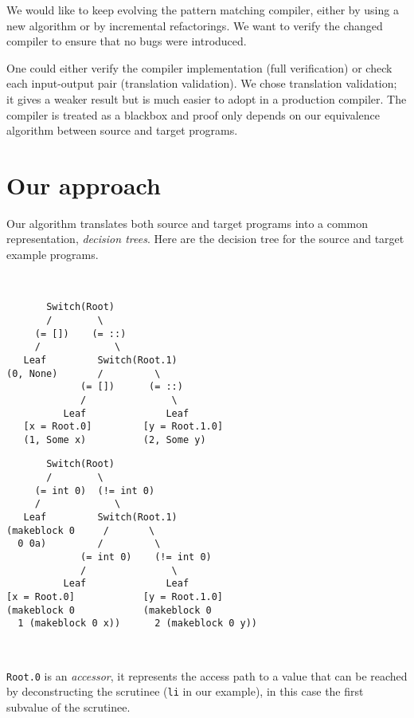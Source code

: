 \documentclass[12pt]{article}
\begin{document}
We would like to keep evolving the pattern matching compiler, either by
using a new algorithm or by incremental refactorings.
We want to verify the changed compiler to ensure that no bugs were
introduced.

One could either verify the compiler implementation
(full verification) or check each input-output pair
(translation validation). We chose translation validation; it gives
a weaker result but is much easier to adopt in a production
compiler. The compiler is treated as a blackbox and proof only depends
on our equivalence algorithm between source and target programs.

\section{Our approach}

Our algorithm translates both source and target programs into a common
representation, \emph{decision trees}. Here are the decision tree for the
source and target example programs.

~

\begin{minipage}{0.4\linewidth}
\begin{verbatim}
       Switch(Root)
       /        \
     (= [])    (= ::)
     /             \
   Leaf         Switch(Root.1)
(0, None)       /         \
             (= [])      (= ::)
             /               \
          Leaf              Leaf
   [x = Root.0]         [y = Root.1.0]
   (1, Some x)          (2, Some y)
\end{verbatim}
\end{minipage}
\hfill
\begin{minipage}{0.5\linewidth}
\begin{verbatim}
       Switch(Root)
       /        \
     (= int 0)  (!= int 0)
     /             \
   Leaf         Switch(Root.1)
(makeblock 0     /       \
  0 0a)         /         \
             (= int 0)    (!= int 0)
             /               \
          Leaf              Leaf
[x = Root.0]            [y = Root.1.0]
(makeblock 0            (makeblock 0
  1 (makeblock 0 x))      2 (makeblock 0 y))
\end{verbatim}
\end{minipage}

~

\texttt{Root.0} is an \emph{accessor}, it represents the
access path to a value that can be reached by deconstructing the
scrutinee (\texttt{li} in our example), in this case the first
subvalue of the scrutinee.
\end{document}
